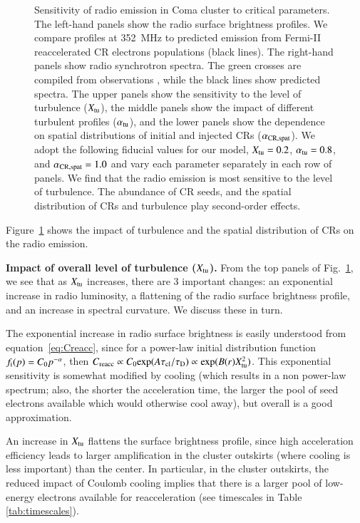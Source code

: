 \documentclass[fleqn,usenatbib,useAMS]{mnras}
\begin{document}
\begin{figure}
\caption{Sensitivity of radio emission in Coma cluster to critical
  parameters. The left-hand panels show the radio surface brightness
  profiles. We compare profiles at 352~MHz \citep[blue
    crosses,][]{brown11} to predicted emission from Fermi-II
  reaccelerated CR electrons populations (black lines). The right-hand
  panels show radio synchrotron spectra. The green crosses are
  compiled from observations \citep{2010PhDT.......259P}, while the
  black lines show predicted spectra. The upper panels show the sensitivity to the level of
  turbulence ($X_{\mathrm{tu}}$), the middle panels show the impact of
  different turbulent profiles ($\alpha_{\mathrm{tu}}$), and the lower
  panels show the dependence on spatial distributions of initial and
  injected CRs ($\alpha_{\mathrm{CR,spat}}$). We adopt the following
  fiducial values for our model, $X_{\mathrm{tu}}=0.2$,
  $\alpha_{\mathrm{tu}}=0.8$, and $\alpha_{\mathrm{CR,spat}}=1.0$ and vary each
  parameter separately in each row of panels. We find that the radio
  emission is most sensitive to the level of turbulence. The abundance of CR seeds, and the spatial distribution of CRs and turbulence play second-order effects.}
  \label{fig:param_comp}
\end{figure}

Figure~\ref{fig:param_comp} shows the impact of turbulence and the
spatial distribution of CRs on the radio emission. 

{\bf Impact of overall level of turbulence ($X_{\rm tu}$).} From the top panels of Fig.~\ref{fig:param_comp}, we see that as $X_{\rm tu}$ increases, there are 3 important changes: an exponential increase in radio luminosity, a flattening of the radio surface brightness profile, and an increase in spectral curvature. We discuss these in turn. 

The exponential increase in radio surface brightness is easily understood from equation~\ref{eq:Creacc}, since for a power-law initial distribution function $f_{\rm i}(p) = C_{\rm 0} p^{-\alpha}$, then $C_{\rm reacc} \propto C_{\rm 0} {\rm exp}(A \tau_{\rm cl}/\tau_{\rm D}) \propto {\rm exp} (B(r) X_{\rm tu}^{2})$. This exponential sensitivity is somewhat modified by cooling (which results in a non power-law spectrum; also, the shorter the acceleration time, the larger the pool of seed electrons available which would otherwise cool away), but overall is a good approximation. %

An increase in $X_{\rm tu}$ flattens the surface brightness profile, since high acceleration efficiency leads to larger amplification in the cluster outskirts (where cooling is less important) than the center. In particular, in the cluster outskirts, the reduced impact of Coulomb cooling implies that there is a larger pool of low-energy electrons available for reacceleration (see timescales in Table \ref{tab:timescales}). 
\end{document}

